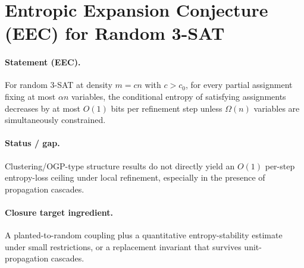 \section{Entropic Expansion Conjecture (EEC) for Random 3-SAT}

\paragraph{Statement (EEC).}
For random $3$-SAT at density $m=cn$ with $c>c_0$, for every partial assignment fixing at most $\alpha n$
variables, the conditional entropy of satisfying assignments decreases by at most $O(1)$ bits per refinement
step unless $\Omega(n)$ variables are simultaneously constrained.

\paragraph{Status / gap.}
Clustering/OGP-type structure results do not directly yield an $O(1)$ per-step entropy-loss ceiling under
local refinement, especially in the presence of propagation cascades.

\paragraph{Closure target ingredient.}
A planted-to-random coupling plus a quantitative entropy-stability estimate under small restrictions,
or a replacement invariant that survives unit-propagation cascades.
